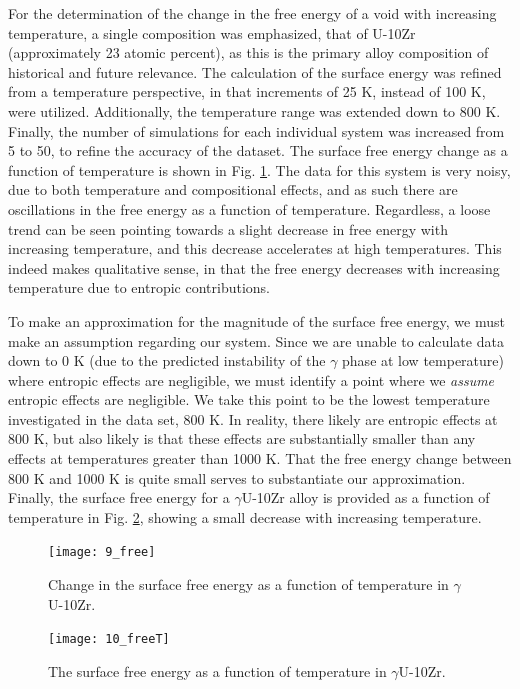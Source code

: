 \documentclass[review]{elsarticle}
\begin{document}
For the determination of the change in the free energy of a void with increasing temperature, a single composition was emphasized, that of U-10Zr (approximately 23 atomic percent), as this is the primary alloy composition of historical and future relevance. The calculation of the surface energy was refined from a temperature perspective, in that increments of 25 K, instead of 100 K, were utilized. Additionally, the temperature range was extended down to 800 K. Finally, the number of simulations for each individual system was increased from 5 to 50, to refine the accuracy of the dataset. The surface free energy change as a function of temperature is shown in Fig. \ref{fig:free}. The data for this system is very noisy, due to both temperature and compositional effects, and as such there are oscillations in the free energy as a function of temperature. Regardless, a loose trend can be seen pointing towards a slight decrease in free energy with increasing temperature, and this decrease accelerates at high temperatures. This indeed makes qualitative sense, in that the free energy decreases with increasing temperature due to entropic contributions. 

To make an approximation for the magnitude of the surface free energy, we must make an assumption regarding our system. Since we are unable to calculate data down to 0 K (due to the predicted instability of the $\gamma$ phase at low temperature) where entropic effects are negligible, we must identify a point where we \textit{assume} entropic effects are negligible. We take this point to be the lowest temperature investigated in the data set, 800 K. In reality, there likely are entropic effects at 800 K, but also likely is that these effects are substantially smaller than any effects at temperatures greater than 1000 K. That the free energy change between 800 K and 1000 K is quite small serves to substantiate our approximation. Finally, the surface free energy for a $\gamma$U-10Zr alloy is provided as a function of temperature in Fig. \ref{fig:freeT}, showing a small decrease with increasing temperature. 

\begin{figure}[!htp]
\begin{center}
\texttt{[image: 9\_free]}
\end{center}
\caption{Change in the surface free energy as a function of temperature in $\gamma$U-10Zr.}
\label{fig:free}
\end{figure}

\begin{figure}[!htp]
\begin{center}
\texttt{[image: 10\_freeT]}
\end{center}
\caption{The surface free energy as a function of temperature in $\gamma$U-10Zr.}
\label{fig:freeT}
\end{figure}
\end{document}
